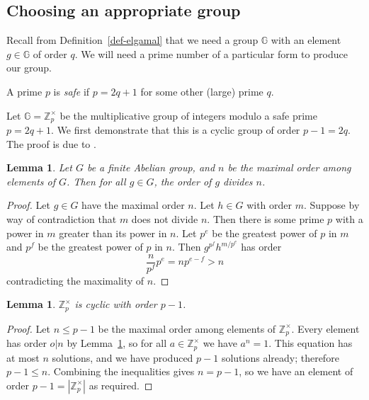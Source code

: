 \documentclass[12pt,a4paper]{article}
\newtheorem{lemma}[theorem]{Lemma}
\theoremstyle{definition}
\begin{document}
\subsection{Choosing an appropriate group}\label{app-elgamal-group}
Recall from Definition~\ref{def-elgamal} that we need a group $\mathbb{G}$ with an element $g\in\mathbb{G}$ of order $q$. We will need a prime number of a particular form to produce our group.
\begin{definition}
    A prime $p$ is \textit{safe} if $p=2q+1$ for some other (large) prime $q$.
\end{definition}
Let $\mathbb{G}=\mathbb{Z}^\times_p$ be the multiplicative group of integers modulo a safe prime $p=2q+1$. We first demonstrate that this is a cyclic group of order $p-1=2q$. The proof is due to \cite{cyclicity}.
\begin{lemma}\label{lem-order-divides}
    Let $G$ be a finite Abelian group, and $n$ be the maximal order among elements of $G$. Then for all $g\in G$, the order of $g$ divides $n$.
\end{lemma}
\begin{proof}
    Let $g\in G$ have the maximal order $n$. Let $h\in G$ with order $m$. Suppose by way of contradiction that $m$ does not divide $n$. Then there is some prime $p$ with a power in $m$ greater than its power in $n$. Let $p^e$ be the greatest power of $p$ in $m$ and $p^f$ be the greatest power of $p$ in $n$. Then $g^{p^f}h^{m/p^e}$ has order
    $$\frac{n}{p^f}p^e=np^{e-f}>n$$
    contradicting the maximality of $n$.
\end{proof}
\begin{lemma}
    $\mathbb{Z}^\times_p$ is cyclic with order $p-1$.
\end{lemma}
\begin{proof}
    Let $n\leq p-1$ be the maximal order among elements of $\mathbb{Z}^\times_p$. Every element has order $o\vert n$ by Lemma~\ref{lem-order-divides}, so for all $a\in\mathbb{Z}^\times_p$ we have $a^n=1$. This equation has at most $n$ solutions, and we have produced $p-1$ solutions already; therefore $p-1\leq n$.
    Combining the inequalities gives $n=p-1$, so we have an element of order $p-1=|\mathbb{Z}^\times_p|$ as required.
\end{proof}
\end{document}
